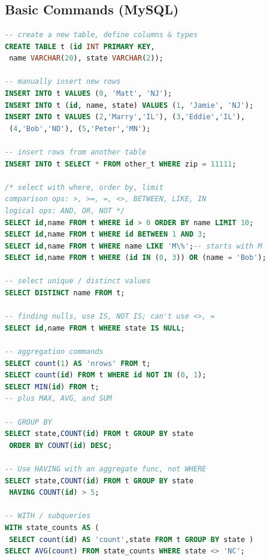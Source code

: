 \chapter{\sql}
\label{sql}

\section{Basic Commands (MySQL)}
\label{sql:basic}

\begin{lstlisting}[language=SQL]
-- create a new table, define columns & types
CREATE TABLE t (id INT PRIMARY KEY,
 name VARCHAR(20), state VARCHAR(2));

-- manually insert new rows
INSERT INTO t VALUES (0, 'Matt', 'NJ');
INSERT INTO t (id, name, state) VALUES (1, 'Jamie', 'NJ');
INSERT INTO t VALUES (2,'Marry','IL'), (3,'Eddie','IL'),
 (4,'Bob','ND'), (5,'Peter','MN');

-- insert rows from another table
INSERT INTO t SELECT * FROM other_t WHERE zip = 11111;

/* select with where, order by, limit
comparison ops: >, >=, =, <>, BETWEEN, LIKE, IN
logical ops: AND, OR, NOT */
SELECT id,name FROM t WHERE id > 0 ORDER BY name LIMIT 10;
SELECT id,name FROM t WHERE id BETWEEN 1 AND 3;
SELECT id,name FROM t WHERE name LIKE 'M\%';-- starts with M
SELECT id,name FROM t WHERE (id IN (0, 3)) OR (name = 'Bob');

-- select unique / distinct values
SELECT DISTINCT name FROM t;

-- finding nulls, use IS, NOT IS; can't use <>, =
SELECT id,name FROM t WHERE state IS NULL;

-- aggregation commands
SELECT count(1) AS 'nrows' FROM t;
SELECT count(id) FROM t WHERE id NOT IN (0, 1);
SELECT MIN(id) FROM t;
-- plus MAX, AVG, and SUM

-- GROUP BY
SELECT state,COUNT(id) FROM t GROUP BY state
 ORDER BY COUNT(id) DESC;

-- Use HAVING with an aggregate func, not WHERE
SELECT state,COUNT(id) FROM t GROUP BY state
 HAVING COUNT(id) > 5;

-- WITH / subqueries
WITH state_counts AS (
 SELECT count(id) AS 'count',state FROM t GROUP BY state )
SELECT AVG(count) FROM state_counts WHERE state <> 'NC';


\end{lstlisting}
